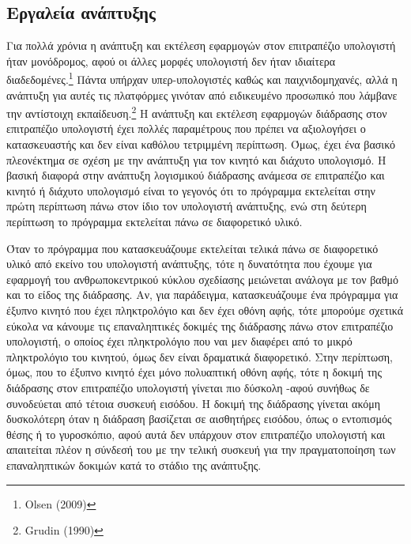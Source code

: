 \documentclass[
]{article}
\begin{document}
\hypertarget{ux3b5ux3c1ux3b3ux3b1ux3bbux3b5ux3afux3b1-ux3b1ux3bdux3acux3c0ux3c4ux3c5ux3beux3b7ux3c2}{%
\subsection{Εργαλεία
ανάπτυξης}\label{ux3b5ux3c1ux3b3ux3b1ux3bbux3b5ux3afux3b1-ux3b1ux3bdux3acux3c0ux3c4ux3c5ux3beux3b7ux3c2}}

Για πολλά χρόνια η ανάπτυξη και εκτέλεση εφαρμογών στον επιτραπέζιο
υπολογιστή ήταν μονόδρομος, αφού οι άλλες μορφές υπολογιστή δεν ήταν
ιδιαίτερα διαδεδομένες.\footnote{Olsen (2009)} Πάντα υπήρχαν
υπερ-υπολογιστές καθώς και παιχνιδομηχανές, αλλά η ανάπτυξη για αυτές
τις πλατφόρμες γινόταν από ειδικευμένο προσωπικό που λάμβανε την
αντίστοιχη εκπαίδευση.\footnote{Grudin (1990)} Η ανάπτυξη και εκτέλεση
εφαρμογών διάδρασης στον επιτραπέζιο υπολογιστή έχει πολλές παραμέτρους
που πρέπει να αξιολογήσει ο κατασκευαστής και δεν είναι καθόλου
τετριμμένη περίπτωση. Όμως, έχει ένα βασικό πλεονέκτημα σε σχέση με την
ανάπτυξη για τον κινητό και διάχυτο υπολογισμό. Η βασική διαφορά στην
ανάπτυξη λογισμικού διάδρασης ανάμεσα σε επιτραπέζιο και κινητό ή
διάχυτο υπολογισμό είναι το γεγονός ότι το πρόγραμμα εκτελείται στην
πρώτη περίπτωση πάνω στον ίδιο τον υπολογιστή ανάπτυξης, ενώ στη δεύτερη
περίπτωση το πρόγραμμα εκτελείται πάνω σε διαφορετικό υλικό.

Όταν το πρόγραμμα που κατασκευάζουμε εκτελείται τελικά πάνω σε
διαφορετικό υλικό από εκείνο του υπολογιστή ανάπτυξης, τότε η δυνατότητα
που έχουμε για εφαρμογή του ανθρωποκεντρικού κύκλου σχεδίασης μειώνεται
ανάλογα με τον βαθμό και το είδος της διάδρασης. Αν, για παράδειγμα,
κατασκευάζουμε ένα πρόγραμμα για έξυπνο κινητό που έχει πληκτρολόγιο και
δεν έχει οθόνη αφής, τότε μπορούμε σχετικά εύκολα να κάνουμε τις
επαναληπτικές δοκιμές της διάδρασης πάνω στον επιτραπέζιο υπολογιστή, ο
οποίος έχει πληκτρολόγιο που ναι μεν διαφέρει από το μικρό πληκτρολόγιο
του κινητού, όμως δεν είναι δραματικά διαφορετικό. Στην περίπτωση, όμως,
που το έξυπνο κινητό έχει μόνο πολυαπτική οθόνη αφής, τότε η δοκιμή της
διάδρασης στον επιτραπέζιο υπολογιστή γίνεται πιο δύσκολη -αφού συνήθως
δε συνοδεύεται από τέτοια συσκευή εισόδου. Η δοκιμή της διάδρασης
γίνεται ακόμη δυσκολότερη όταν η διάδραση βασίζεται σε αισθητήρες
εισόδου, όπως ο εντοπισμός θέσης ή το γυροσκόπιο, αφού αυτά δεν υπάρχουν
στον επιτραπέζιο υπολογιστή και απαιτείται πλέον η σύνδεσή του με την
τελική συσκευή για την πραγματοποίηση των επαναληπτικών δοκιμών κατά το
στάδιο της ανάπτυξης.
\end{document}
